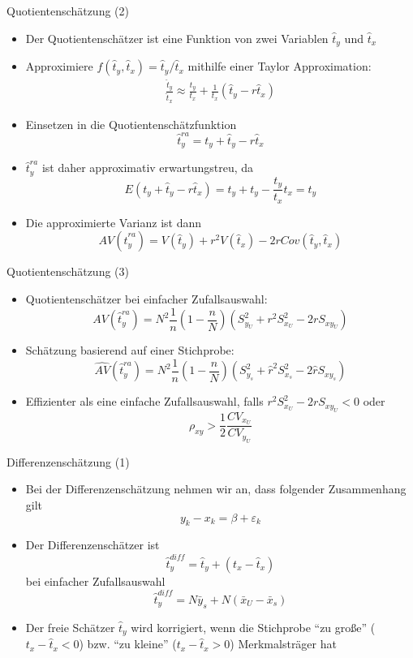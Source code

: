 \documentclass[9pt]{beamer}
\begin{document}
\begin{frame}{Quotientenschätzung (2)}
\begin{itemize}
	\item Der Quotientenschätzer ist eine Funktion von zwei Variablen $\hat{t}_y$ und $\hat{t}_x$
	\item Approximiere $f(\hat{t}_y,\hat{t}_x)=\hat{t}_y/\hat{t}_x$ mithilfe einer Taylor Approximation:
	\begin{align*}
		\frac{\hat{t}_y}{\hat{t}_x} \approx \frac{t_y}{t_x} + \frac{1}{t_x}(\hat{t}_y-r\hat{t}_x)
	\end{align*}
	\item Einsetzen in die Quotientenschätzfunktion
	$$\hat{t}_y^{ra} = t_y + \hat{t}_y - r \hat{t}_x$$
	\item $\hat{t}_y^{ra}$ ist daher approximativ erwartungstreu, da
	$$E( t_y + \hat{t}_y - r \hat{t}_x) = t_y +t_y -\frac{t_y}{t_x}t_x = t_y$$
	\item Die approximierte Varianz ist dann
	$$AV(\hat{t}_y^{ra})=V(\hat{t}_y)+r^2 V(\hat{t}_x)-2rCov(\hat{t}_y,\hat{t}_x)$$
	
\end{itemize}
\end{frame}


\begin{frame}{Quotientenschätzung (3)}
\begin{itemize}
	\item Quotientenschätzer bei einfacher Zufallsauswahl:
	$$AV(\hat{t}_y^{ra}) = N^2\frac{1}{n}\left(1-\frac{n}{N}\right)\left(S_{y_U}^2+r^2 S_{x_U}^2 - 2r S_{xy_U}\right)$$
	\item Schätzung basierend auf einer Stichprobe:
	$$\hat{AV}(\hat{t}_y^{ra}) = N^2\frac{1}{n}\left(1-\frac{n}{N}\right)\left(S_{y_s}^2+\hat{r}^2 S_{x_s}^2 - 2\hat{r} S_{xy_s}\right)$$
	
	\item Effizienter als eine einfache Zufallsauswahl, falls $r^2S_{x_U}^2 - 2r S_{xy_U}<0$ oder
	$$ \rho_{xy} > \frac{1}{2} \frac{CV_{x_U}}{CV_{y_U}}$$
\end{itemize}
\end{frame}

\begin{frame}{Differenzenschätzung (1)}
\begin{itemize}
	\item Bei der Differenzenschätzung nehmen wir an, dass folgender Zusammenhang gilt $$y_k - x_k = \beta + \varepsilon_k$$
	\item Der Differenzenschätzer ist
	$$ \hat{t}_y^{diff} = \hat{t}_y + (t_x -\hat{t}_x)$$
	bei einfacher Zufallsauswahl
	$$ \hat{t}_y^{diff} = N \bar{y}_s + N(\bar{x}_U - \bar{x}_s)$$
	\item Der freie Schätzer $\hat{t}_y$ wird korrigiert, wenn die Stichprobe \enquote{zu große} ($t_x -\hat{t}_x<0$) bzw. \enquote{zu kleine} ($t_x -\hat{t}_x>0$) Merkmalsträger hat
\end{itemize}
\end{frame}
\end{document}
